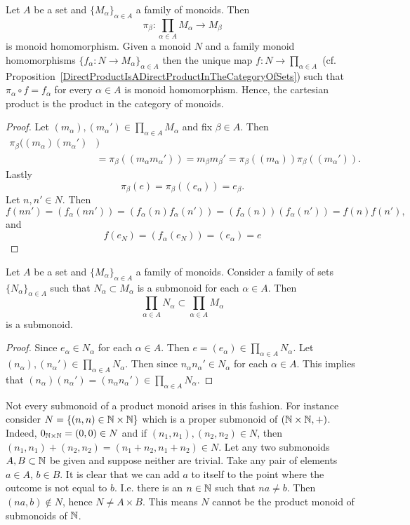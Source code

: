 \begin{lemma}\label{ProductMonoidIsAProductInTheCategoryOfMonoids}
    Let $A$ be a set and $\{M_\alpha\}_{\alpha\in A}$ a family of monoids. Then 
    $$\pi_\beta : \prod_{\alpha\in A} M_\alpha \rightarrow M_\beta$$
    is monoid homomorphism. Given a monoid $N$ and a family monoid homomorphisms $\{f_\alpha : N\rightarrow M_\alpha\}_{\alpha\in A}$ then the unique map $f: N\rightarrow \prod_{\alpha\in A}$ (cf. Proposition~\ref{DirectProductIsADirectProductInTheCategoryOfSets}) such that $\pi_\alpha \circ f = f_\alpha$ for every $\alpha \in A$ is monoid homomorphism. Hence, the cartesian product is the product in the category of monoids. 
\end{lemma}
\begin{proof}
    Let $(m_\alpha),(m_\alpha')\in \prod_{\alpha\in A} M_\alpha$ and fix $\beta \in A$. Then 
    \begin{align*} 
        \pi_\beta((m_\alpha)(m_\alpha') &)\\ 
        &= \pi_\beta((m_\alpha m_\alpha')) = m_\beta m_\beta' = \pi_\beta((m_\alpha))\pi_\beta((m_\alpha')).
    \end{align*}
    Lastly 
    $$\pi_\beta(e)=\pi_\beta((e_\alpha))=e_\beta.$$
    Let $n,n' \in N$. Then 
    $$f(nn') = (f_\alpha(nn'))=(f_\alpha(n)f_\alpha(n'))=(f_\alpha(n))(f_\alpha(n'))=f(n)f(n'),$$
    and 
    $$f(e_N)=(f_\alpha(e_N))=(e_\alpha)=e$$
\end{proof}
\begin{proposition}\label{CertainSubmonoidsOfProductMonoid}
    Let $A$ be a set and $\{M_\alpha\}_{\alpha\in A}$ a family of monoids. Consider a family of sets $\{N_\alpha\}_{\alpha\in A}$ such that $N_\alpha\subset M_\alpha$ is a submonoid for each $\alpha\in A$. Then $$\prod_{\alpha\in A} N_\alpha \subset \prod_{\alpha \in A} M_\alpha$$
    is a submonoid.
\end{proposition}
\begin{proof}
    Since $e_\alpha \in N_\alpha$ for each $\alpha \in A$. Then $e=(e_\alpha)\in \prod_{\alpha\in A} N_\alpha.$ Let $(n_\alpha),(n_\alpha')\in \prod_{\alpha\in A} N_\alpha$. Then since $n_\alpha n_\alpha'\in N_\alpha$ for each $\alpha \in A$. This implies that $(n_\alpha)(n_\alpha') = (n_\alpha n_\alpha')\in \prod_{\alpha\in A} N_\alpha$.
\end{proof}
\begin{example}
    Not every submonoid of a product monoid arises in this fashion. For instance consider $N=\{(n,n)\in\mathbb{N}\times \mathbb{N} \}$ which is a proper submonoid of $(\mathbb{N}\times \mathbb{N},+)$. Indeed, $0_{\mathbb{N}\times \mathbb{N}} = (0,0)\in N$ and if $(n_1,n_1),(n_2,n_2)\in N$, then $(n_1,n_1)+(n_2,n_2)=(n_1+n_2,n_1+n_2)\in N$. Let any two submonoids $A,B\subset \mathbb{N}$ be given and suppose neither are trivial. Take any pair of elements $a\in A$, $b\in B$. It is clear that we can add $a$ to itself to the point where the outcome is not equal to $b$. I.e. there is an $n\in\mathbb{N}$ such that $na\neq b$. Then $(na,b)\notin N$, hence $N\neq A\times B$. This means $N$ cannot be the product monoid of submonoids of $\mathbb{N}$.
\end{example}
